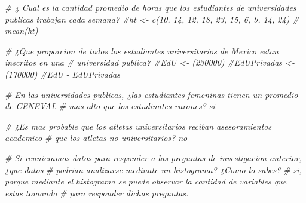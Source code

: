 \documentclass[
]{article}
\newenvironment{Shaded}{\begin{snugshade}}{\end{snugshade}}
\newcommand{\CommentTok}[1]{\textcolor[rgb]{0.56,0.35,0.01}{\textit{#1}}}
\begin{document}
\begin{Shaded}
\begin{Highlighting}[]
\CommentTok{\# ¿ Cual es la cantidad promedio de horas que los estudiantes de universidades publicas trabajan cada semana?}
\CommentTok{\#ht \textless{}{-} c(10, 14, 12, 18, 23, 15, 6, 9, 14, 24)}
\CommentTok{\# mean(ht)}

\CommentTok{\# ¿Que proporcion de todos los estudiantes universitarios de Mexico estan inscritos en una}
\CommentTok{\# universidad publica?}
\CommentTok{\#EdU \textless{}{-} (230000)}
\CommentTok{\#EdUPrivadas \textless{}{-}(170000)}
\CommentTok{\#EdU {-} EdUPrivadas}

\CommentTok{\# En las universidades publicas, ¿las estudiantes femeninas tienen un promedio de CENEVAL}
\CommentTok{\# mas alto que los estudinates varones? si}

\CommentTok{\# ¿Es mas probable que los atletas universitarios reciban asesoramientos academico}
\CommentTok{\# que los atletas no universitarios? no}

\CommentTok{\# Si reunieramos datos para responder a las preguntas de investigacion anterior, ¿que datos}
\CommentTok{\# podrian analizarse medinate un histograma? ¿Como lo sabes?}
\CommentTok{\# si, porque mediante el histograma se puede observar la cantidad de variables que estas tomando}
\CommentTok{\# para responder dichas preguntas.}
\end{Highlighting}
\end{Shaded}
\end{document}
